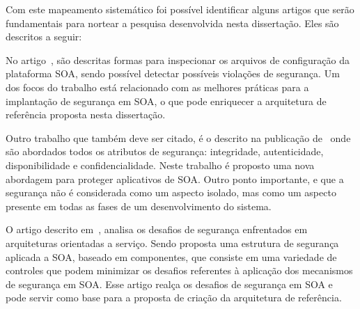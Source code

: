 Com este mapeamento sistemático foi possível identificar alguns artigos que serão fundamentais para nortear a pesquisa desenvolvida nesta dissertação. Eles são descritos a seguir:

No artigo~\cite{ WeberAM07}, são descritas formas para inspecionar os arquivos de configuração da plataforma SOA, sendo possível detectar possíveis violações de segurança. Um dos focos do trabalho está relacionado com as melhores práticas para a implantação de segurança em SOA, o que pode enriquecer a arquitetura de referência proposta nesta dissertação.

Outro trabalho que também deve ser citado, é o descrito na publicação de~\cite{pattern-driven2008} onde são abordados todos os atributos de segurança: integridade, autenticidade, disponibilidade e confidencialidade. Neste trabalho é proposto uma nova abordagem para proteger aplicativos de SOA. Outro ponto importante, e que a segurança não é considerada como um aspecto isolado, mas como um aspecto presente em todas as fases de um desenvolvimento do sistema.

O artigo descrito em~\cite{Coetzee2012}, analisa os desafios de segurança enfrentados em arquiteturas orientadas a serviço. Sendo proposta uma estrutura de segurança aplicada a SOA, baseado em componentes, que consiste em uma variedade de controles que podem minimizar os desafios referentes à aplicação dos mecanismos de segurança em SOA. Esse artigo realça os desafios de segurança em SOA e pode servir como base para a proposta de criação da arquitetura de referência. 